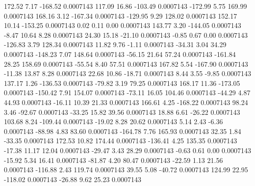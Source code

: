      172.52        7.17     -168.52     0.0007143
      117.09       16.86     -103.49     0.0007143
     -172.99        5.75      169.99     0.0007143
      168.16        3.12     -167.34     0.0007143
     -129.95        9.29      128.02     0.0007143
      152.17       10.14     -153.25     0.0007143
        0.02        0.11        0.00     0.0007143
      143.77        3.20     -144.05     0.0007143
       -8.47       10.64        8.28     0.0007143
       24.30       15.18      -21.10     0.0007143
       -0.85        0.67        0.00     0.0007143
     -126.83        3.79      128.34     0.0007143
       11.82        9.76       -1.11     0.0007143
      -34.31        3.04       34.29     0.0007143
     -148.23        7.07      148.64     0.0007143
      -56.15       21.64       57.24     0.0007143
     -161.84       28.25      158.69     0.0007143
      -55.54        8.40       57.51     0.0007143
      167.82        5.54     -167.90     0.0007143
      -11.38       13.87        8.28     0.0007143
       22.68       10.86      -18.71     0.0007143
        8.44        3.55       -9.85     0.0007143
      137.17        1.26     -136.53     0.0007143
      -79.82        3.19       79.25     0.0007143
      168.17       11.36     -173.05     0.0007143
     -150.42        7.91      154.07     0.0007143
      -73.11       16.05      104.46     0.0007143
      -44.29        4.87       44.93     0.0007143
      -16.11       10.39       21.33     0.0007143
      166.61        4.25     -168.22     0.0007143
       98.24        3.46      -92.67     0.0007143
      -33.25       15.82       39.56     0.0007143
       18.88        6.61      -26.22     0.0007143
      103.68        8.24     -109.44     0.0007143
      -19.02        8.28       20.62     0.0007143
        5.14        2.43       -6.36     0.0007143
      -88.98        4.83       83.60     0.0007143
     -164.78        7.76      165.93     0.0007143
       32.35        1.84      -33.35     0.0007143
      172.53       10.82      174.44     0.0007143
     -136.41        4.25      135.35     0.0007143
      -17.38       11.17       12.04     0.0007143
      -29.47        3.43       28.29     0.0007143
       -0.63        0.61        0.00     0.0007143
      -15.92        5.34       16.41     0.0007143
      -81.87        4.20       80.47     0.0007143
      -22.59        1.13       21.56     0.0007143
     -116.88        2.43      119.74     0.0007143
       39.55        5.08      -40.72     0.0007143
      124.99       22.95     -118.02     0.0007143
      -26.88        9.62       25.23     0.0007143
